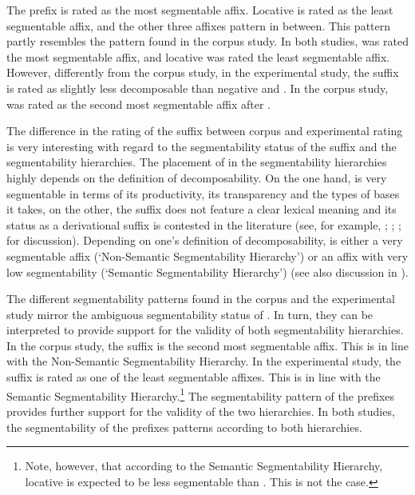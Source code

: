 \clearpage

The prefix  is rated as the most segmentable affix. 
 Locative  is rated as the least segmentable affix, and the other three affixes pattern in between. 
  This pattern partly resembles the pattern found in the corpus study. In both studies,  was rated the most segmentable affix, and locative  was rated the least segmentable affix. 
 However, differently from the corpus study, in the experimental study, the suffix  is rated as slightly less decomposable than negative  and . In the corpus study,  was rated as the second most segmentable affix after .


The difference in the rating of the suffix  between corpus and experimental rating is very interesting with regard to the segmentability status of the suffix and the segmentability hierarchies. The placement of  in the segmentability hierarchies highly depends on the definition of decomposability. On the one hand,  is very segmentable in terms of its productivity, its transparency and the types of bases it takes, on the other, the suffix does not feature a clear lexical meaning and its status as a derivational suffix is contested in the literature (see, for example, \citealt{Zwicky.1995}; \citealt{Plag.2003}; \citealt{Giegerich.2012}; \citealt{Bauer.2013} for discussion). Depending on one's definition of decomposability,  is either a very segmentable affix (`Non-Semantic Segmentability Hierarchy') or an affix with very low segmentability (`Semantic Segmentability Hierarchy') (see also discussion in ). 

The different segmentability patterns found in the corpus and the experimental study mirror the ambiguous segmentability status of . In turn, they can be interpreted to provide support for the validity of both segmentability hierarchies. 
In the corpus study, the suffix  is the second most segmentable affix. This is in line with the Non-Semantic Segmentability Hierarchy. 
In the experimental study, the suffix  is rated as one of the least segmentable affixes. This is in line with the Semantic Segmentability Hierarchy.\footnote{Note, however, that according to the Semantic Segmentability Hierarchy, locative  is expected to be less segmentable than . This is not the case. }
The segmentability pattern of the prefixes provides further support for the validity of the two hierarchies. In both studies, the segmentability of the prefixes patterns according to both hierarchies. 



